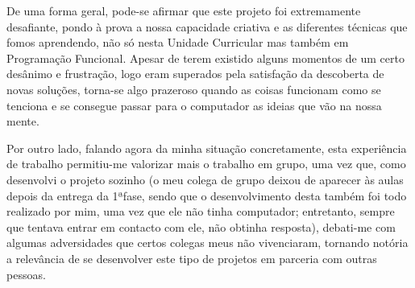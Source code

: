 \documentclass[a4paper]{report} %
\begin{document}
    \par \noindent De uma forma geral, pode-se afirmar que este projeto foi extremamente desafiante, pondo à prova a nossa capacidade criativa e as diferentes técnicas que fomos aprendendo, não só nesta Unidade Curricular mas também em Programação Funcional. Apesar de terem existido alguns momentos de um certo desânimo e frustração, logo eram superados pela satisfação da descoberta de novas soluções, torna-se algo prazeroso quando as coisas funcionam como se tenciona e se consegue passar para o computador as ideias que vão na nossa mente.
    
    \par \noindent Por outro lado, falando agora da minha situação concretamente, esta experiência de trabalho permitiu-me valorizar mais o trabalho em grupo, uma vez que, como desenvolvi o projeto sozinho (o meu colega de grupo deixou de aparecer às aulas depois da entrega da 1ªfase, sendo que o desenvolvimento desta também foi todo realizado por mim, uma vez que ele não tinha computador; entretanto, sempre que tentava entrar em contacto com ele, não obtinha resposta), debati-me com algumas adversidades que certos colegas meus não vivenciaram, tornando notória a relevância de se desenvolver este tipo de projetos em parceria com outras pessoas.
\end{document}
